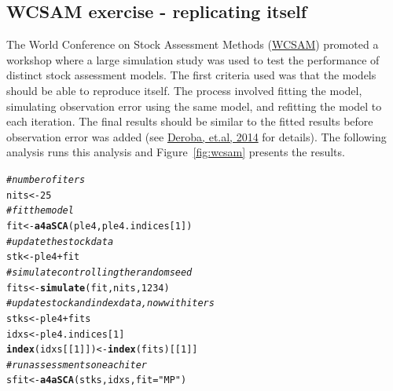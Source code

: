 \documentclass[a4paper,english,10pt]{article}\usepackage[]{graphicx}\usepackage[]{color}
\makeatletter
\newcommand{\hlnum}[1]{\textcolor[rgb]{0.686,0.059,0.569}{#1}}%
\newcommand{\hlstr}[1]{\textcolor[rgb]{0.192,0.494,0.8}{#1}}%
\newcommand{\hlcom}[1]{\textcolor[rgb]{0.678,0.584,0.686}{\textit{#1}}}%
\newcommand{\hlopt}[1]{\textcolor[rgb]{0,0,0}{#1}}%
\newcommand{\hlstd}[1]{\textcolor[rgb]{0.345,0.345,0.345}{#1}}%
\newcommand{\hlkwb}[1]{\textcolor[rgb]{0.69,0.353,0.396}{#1}}%
\newcommand{\hlkwc}[1]{\textcolor[rgb]{0.333,0.667,0.333}{#1}}%
\newcommand{\hlkwd}[1]{\textcolor[rgb]{0.737,0.353,0.396}{\textbf{#1}}}%
\newenvironment{kframe}{%
 \def\at@end@of@kframe{}%
 \ifinner\ifhmode%
  \def\at@end@of@kframe{\end{minipage}}%
  \begin{minipage}{\columnwidth}%
 \fi\fi%
 \def\FrameCommand##1{\hskip\@totalleftmargin \hskip-\fboxsep
 \colorbox{shadecolor}{##1}\hskip-\fboxsep
     \hskip-\linewidth \hskip-\@totalleftmargin \hskip\columnwidth}%
 \MakeFramed {\advance\hsize-\width
   \@totalleftmargin\z@ \linewidth\hsize
   \@setminipage}}%
 {\par\unskip\endMakeFramed%
 \at@end@of@kframe}
\newenvironment{knitrout}{}{} %
\makeatother
\begin{document}
\subsection{WCSAM exercise - replicating itself}

The World Conference on Stock Assessment Methods (\href{http://www.ices.dk/news-and-events/symposia/WCSAM-2013}{WCSAM}) promoted a workshop where a large simulation study was used to test the performance of distinct stock assessment models. The first criteria used was that the models should be able to reproduce itself. The process involved fitting the model, simulating observation error using the same model, and refitting the model to each iteration. The final results should be similar to the fitted results before observation error was added (see \href{http://icesjms.oxfordjournals.org/content/early/2014/01/18/icesjms.fst237.abstract}{Deroba, et.al, 2014} for details). The following analysis runs this analysis and Figure~\ref{fig:wcsam} presents the results.

\begin{knitrout}
\color{fgcolor}\begin{kframe}
\begin{alltt}
\hlcom{# number of iters}
\hlstd{nits} \hlkwb{<-} \hlnum{25}
\hlcom{# fit the model}
\hlstd{fit} \hlkwb{<-} \hlkwd{a4aSCA}\hlstd{(ple4, ple4.indices[}\hlnum{1}\hlstd{])}
\hlcom{# update the stock data}
\hlstd{stk} \hlkwb{<-} \hlstd{ple4} \hlopt{+} \hlstd{fit}
\hlcom{# simulate controlling the random seed}
\hlstd{fits} \hlkwb{<-} \hlkwd{simulate}\hlstd{(fit, nits,} \hlnum{1234}\hlstd{)}
\hlcom{# update stock and index data, now with iters}
\hlstd{stks} \hlkwb{<-} \hlstd{ple4} \hlopt{+} \hlstd{fits}
\hlstd{idxs} \hlkwb{<-} \hlstd{ple4.indices[}\hlnum{1}\hlstd{]}
\hlkwd{index}\hlstd{(idxs[[}\hlnum{1}\hlstd{]])} \hlkwb{<-} \hlkwd{index}\hlstd{(fits)[[}\hlnum{1}\hlstd{]]}
\hlcom{# run assessments on each iter}
\hlstd{sfit} \hlkwb{<-} \hlkwd{a4aSCA}\hlstd{(stks, idxs,} \hlkwc{fit} \hlstd{=} \hlstr{"MP"}\hlstd{)}
\end{alltt}
\end{kframe}
\end{knitrout}
\end{document}
